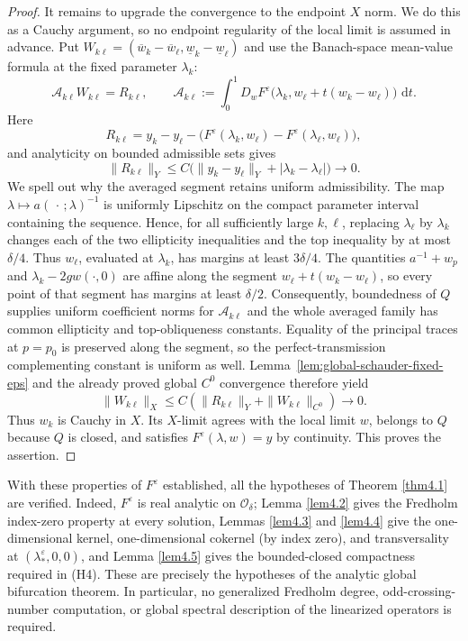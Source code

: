 \documentclass[11pt,reqno]{amsart}
\numberwithin{equation}{section}
\newcommand{\dd}{\,\mathrm{d}}
\theoremstyle{definition}
\theoremstyle{remark}
\begin{document}
\begin{proof}
It remains to upgrade the convergence to the endpoint $X$ norm.
We do this as a Cauchy argument, so no endpoint regularity of the
local limit is assumed in advance.  Put
$W_{k\ell}=(\overline w_k-\overline w_\ell,
\underline w_k-\underline w_\ell)$ and use the Banach-space
mean-value formula at the fixed parameter $\lambda_k$:
\[
 \mathscr A_{k\ell}W_{k\ell}=R_{k\ell},
 \qquad
 \mathscr A_{k\ell}:=
 \int_0^1D_wF^\varepsilon
 \bigl(\lambda_k,w_\ell+t(w_k-w_\ell)\bigr)\,\dd t.
\]
Here
\[
 R_{k\ell}=y_k-y_\ell-
 \bigl(F^\varepsilon(\lambda_k,w_\ell)
       -F^\varepsilon(\lambda_\ell,w_\ell)\bigr),
\]
and analyticity on bounded admissible sets gives
\[
 \|R_{k\ell}\|_Y
 \le C\bigl(\|y_k-y_\ell\|_Y
             +|\lambda_k-\lambda_\ell|\bigr)\longrightarrow0.
\]
We spell out why the averaged segment retains uniform admissibility.
The map
$\lambda\mapsto a(\,\cdot\,;\lambda)^{-1}$ is uniformly Lipschitz on
the compact parameter interval containing the sequence.  Hence, for
all sufficiently large $k,\ell$, replacing $\lambda_\ell$ by
$\lambda_k$ changes each of the two ellipticity inequalities and the
top inequality by at most $\delta/4$.  Thus $w_\ell$, evaluated at
$\lambda_k$, has margins at least $3\delta/4$.  The quantities
$a^{-1}+w_p$ and $\lambda_k-2gw(\cdot,0)$ are affine along the
segment $w_\ell+t(w_k-w_\ell)$, so every point of that segment has
margins at least $\delta/2$.  Consequently, boundedness of $Q$
supplies uniform coefficient norms for $\mathscr A_{k\ell}$ and the
whole averaged family has common ellipticity and top-obliqueness
constants.  Equality of the principal traces at $p=p_0$ is preserved
along the segment, so the perfect-transmission complementing constant
is uniform as well.
Lemma~\ref{lem:global-schauder-fixed-eps} and the already proved
global $C^0$ convergence therefore yield
\[
 \|W_{k\ell}\|_X
 \le C\left(\|R_{k\ell}\|_Y+
             \|W_{k\ell}\|_{C^0}\right)\longrightarrow0.
\]
Thus $w_k$ is Cauchy in $X$.  Its $X$-limit agrees with the local
limit $w$, belongs to $Q$ because $Q$ is closed, and satisfies
$F^\varepsilon(\lambda,w)=y$ by continuity.  This proves the
assertion.
\end{proof}

With these properties of $F^{\varepsilon}$ established, all the
hypotheses of Theorem \ref{thm4.1} are verified.  Indeed,
$F^\varepsilon$ is real analytic on $\mathcal O_\delta$; Lemma
\ref{lem4.2} gives the Fredholm index-zero property at every solution,
Lemmas \ref{lem4.3} and \ref{lem4.4} give the one-dimensional kernel,
one-dimensional cokernel (by index zero), and transversality at
$(\lambda_*^\varepsilon,0,0)$, and Lemma \ref{lem4.5} gives the
bounded-closed compactness required in (H4).  These are precisely the
hypotheses of the analytic global bifurcation theorem.  In particular,
no generalized Fredholm degree, odd-crossing-number computation, or
global spectral description of the linearized operators is required.
\end{document}
